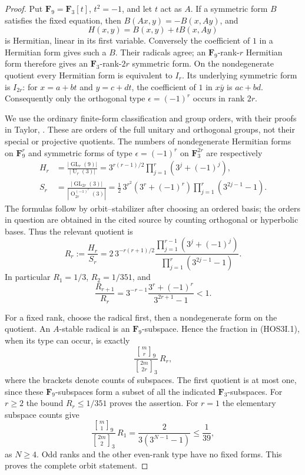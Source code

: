\begin{proof}
Put $\mathbf F_9=\mathbf F_3[t]$, $t^2=-1$, and let $t$ act as
$A$. If a symmetric form $B$ satisfies the fixed equation, then
$B(Ax,y)=-B(x,Ay)$, and
\[
                   H(x,y)=B(x,y)+tB(x,Ay)                    \tag{HOS3I.2}
\]
is Hermitian, linear in its first variable. Conversely the coefficient
of $1$ in a Hermitian form gives such a $B$. Their radicals agree;
an $\mathbf F_9$-rank-$r$ Hermitian form therefore gives an
$\mathbf F_3$-rank-$2r$ symmetric form. On the nondegenerate
quotient every Hermitian form is equivalent to $I_r$. Its underlying
symmetric form is $I_{2r}$: for $x=a+bt$ and $y=c+dt$, the
coefficient of $1$ in $x\bar y$ is $ac+bd$. Consequently only
the orthogonal type $\epsilon=(-1)^r$ occurs in rank $2r$.

We use the ordinary finite-form classification and group orders,
with their proofs in Taylor, \cite[pp.~115--118 and 138--141]{HOS:Taylor1992}.
These are orders of the full unitary and orthogonal groups, not their
special or projective quotients. The numbers of nondegenerate
Hermitian forms on $\mathbf F_9^r$ and symmetric forms of type
$\epsilon=(-1)^r$ on $\mathbf F_3^{2r}$ are respectively
\[
 \begin{split}
 H_r&=\frac{|\operatorname{GL}_r(9)|}{|\operatorname U_r(3)|}
      =3^{r(r-1)/2}\prod_{j=1}^{r}(3^j+(-1)^j),\\
 S_r&=\frac{|\operatorname{GL}_{2r}(3)|}
                  {|\operatorname O_{2r}^{(-1)^r}(3)|}
      =\frac12\,3^{r^2}(3^r+(-1)^r)
                       \prod_{j=1}^{r}(3^{2j-1}-1).
 \end{split}                                                   \tag{HOS3I.3}
\]
The formulas follow by orbit--stabilizer after choosing an ordered
basis; the orders in question are obtained in the cited source by
counting orthogonal or hyperbolic bases. Thus the relevant quotient is
\[
 R_r:=\frac{H_r}{S_r}
   =2\,3^{-r(r+1)/2}
       \frac{\prod_{j=1}^{r-1}(3^j+(-1)^j)}
            {\prod_{j=1}^{r}(3^{2j-1}-1)}.                     \tag{HOS3I.4}
\]
In particular $R_1=1/3$, $R_2=1/351$, and
\[
 \frac{R_{r+1}}{R_r}
     =3^{-r-1}\frac{3^r+(-1)^r}{3^{2r+1}-1}<1.               \tag{HOS3I.5}
\]

For a fixed rank, choose the radical first, then a nondegenerate form
on the quotient. An $A$-stable radical is an $\mathbf F_9$-subspace.
Hence the fraction in (HOS3I.1), when its type can occur, is exactly
\[
       \frac{{m\brack r}_{9}}{{2m\brack2r}_{3}}\,R_r,         \tag{HOS3I.6}
\]
where the brackets denote counts of subspaces. The first quotient is
at most one, since these $\mathbf F_9$-subspaces form a subset of
all the indicated $\mathbf F_3$-subspaces. For $r\ge2$ the bound
$R_r\le1/351$ proves the assertion. For $r=1$ the elementary
subspace counts give
\[
 \frac{{m\brack1}_{9}}{{2m\brack2}_{3}}\,R_1
     =\frac{2}{3(3^{N-1}-1)}\le\frac1{39},                   \tag{HOS3I.7}
\]
as $N\ge4$. Odd ranks and the other even-rank type have no fixed
forms. This proves the complete orbit statement.
\end{proof}

